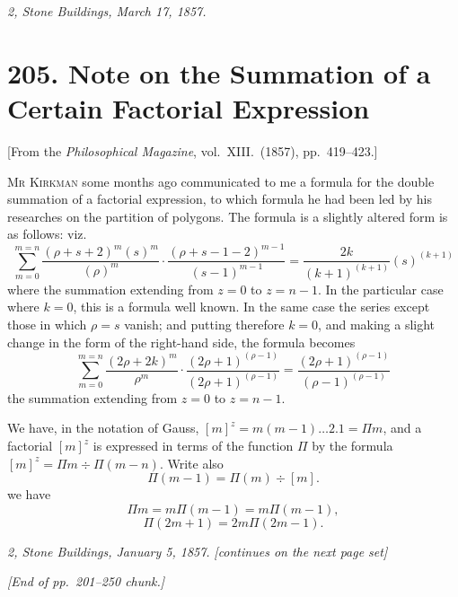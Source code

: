 \documentclass[12pt,a4paper]{article}
\theoremstyle{definition}
\begin{document}
\bigskip

\noindent\textit{2, Stone Buildings, March 17, 1857.}

\newpage


\section*{205. Note on the Summation of a Certain Factorial Expression}

\begin{center}
[From the \textit{Philosophical Magazine}, vol.~XIII.~(1857), pp.~419--423.]
\end{center}

\bigskip

M\textsc{r} K\textsc{irkman} some months ago communicated to me a formula for the double
summation of a factorial expression, to which formula he had been led by his researches
on the partition of polygons. The formula is a slightly altered form is as follows: viz.
\[
\sum_{m=0}^{m=n}\frac{(\rho + s + 2)^m(s)^m}{(\rho)^m} \cdot \frac{(\rho + s - 1 - 2)^{m-1}}{(s-1)^{m-1}} = \frac{2k}{(k+1)^{(k+1)}}(s)^{(k+1)}
\]
where the summation extending from $z = 0$ to $z = n - 1$. In the particular case where $k = 0$,
this is a formula well known. In the same case the series except those in which
$\rho = s$ vanish; and putting therefore $k = 0$, and making a slight change in
the form of the right-hand side, the formula becomes
\[
\sum_{m=0}^{m=n}\frac{(2\rho + 2k)^m}{\rho^m}\cdot \frac{(2\rho + 1)^{(\rho-1)}}{(2\rho+1)^{(\rho-1)}} = \frac{(2\rho + 1)^{(\rho-1)}}{(\rho-1)^{(\rho-1)}}
\]
the summation extending from $z = 0$ to $z = n - 1$.

\bigskip

We have, in the notation of Gauss, $[m]^z = m(m - 1)\ldots 2.1 = \Pi m$, and a factorial
$[m]^z$ is expressed in terms of the function $\Pi$ by the formula $[m]^z = \Pi m \div \Pi(m - n)$.
Write also
\[
\Pi(m - 1) = \Pi(m) \div [m].
\]
we have
\[
\Pi m = m \Pi(m - 1) = m \Pi(m - 1),
\]
\[
\Pi(2m + 1) = 2m \Pi(2m - 1).
\]

\bigskip

\noindent\textit{2, Stone Buildings, January 5, 1857.} \quad\textit{[continues on the next page set]}

\bigskip

\noindent\textit{[End of pp.~201--250 chunk.]}
\end{document}
